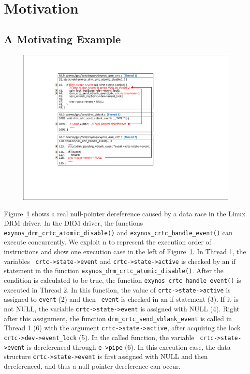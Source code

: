 \section{Motivation}
\label{sec_motivation}

\subsection{A Motivating Example}
\label{subsec_motivating_example}

\begin{figure}[htbp]
	\centering
	\includegraphics[width=1\linewidth]{figures/fig_demo_bug.pdf}
	\label{fig_demo_bug}
\end{figure}
Figure~\ref{fig_demo_bug} shows a real null-pointer dereference caused by a 
data race in the Linux DRM driver. In the DRM driver, the functions {\tt 
exynos\_drm\_crtc\_atomic\_disable()} and {\tt exynos\_crtc\_handle\_event()} 
can execute concurrently. We exploit \textcircled{\footnotesize{n}} to 
represent the execution order of instructions and show one execution case in 
the left of Figure~\ref{fig_demo_bug}. In Thread 1, the variables {\tt 
crtc->state->event} and {\tt crtc->state->active} is checked by an if statement 
in the function {\tt exynos\_drm\_crtc\_atomic\_disable()}. After the condition 
is calculated to be true, the function {\tt exynos\_crtc\_handle\_event()} is 
executed in Thread 2. In this function, the value of {\tt crtc->state->active} 
is assigned to {\tt event} (\textcircled{\footnotesize{2}}) and then {\tt 
event} is checked in an if statement (\textcircled{\footnotesize{3}}). If it is 
not NULL, the variable {\tt crtc->state->event} is assigned with NULL 
(\textcircled{\footnotesize{4}}). Right after this assignment, the function 
{\tt drm\_crtc\_send\_vblank\_event} is called  in Thread 1 
(\textcircled{\footnotesize{6}}) with the argument {\tt crtc->state->active}, 
after acquiring the lock {\tt crtc->dev->event\_lock} 
(\textcircled{\footnotesize{5}}). In the called function, the variable {\tt 
crtc->state->event} is dereferenced through {\tt e->pipe} 
(\textcircled{\footnotesize{6}}). In this execution case, the data structure 
{\tt crtc->state->event} is first assigned with NULL and then dereferenced, and 
thus a null-pointer dereference can occur.

